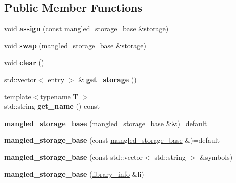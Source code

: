 \subsection*{Public Member Functions}
\begin{DoxyCompactItemize}
\item 
void {\bfseries assign} (const \hyperlink{a00213}{mangled\+\_\+storage\+\_\+base} \&storage)\hypertarget{a00213_ac4989f636dfa95e4227246011e78c3cf}{}\label{a00213_ac4989f636dfa95e4227246011e78c3cf}

\item 
void {\bfseries swap} (\hyperlink{a00213}{mangled\+\_\+storage\+\_\+base} \&storage)\hypertarget{a00213_a70f98c02298a3beee142579612d5c3af}{}\label{a00213_a70f98c02298a3beee142579612d5c3af}

\item 
void {\bfseries clear} ()\hypertarget{a00213_a3bfdf5084f6b0bfcaf41c4d05d2fc7af}{}\label{a00213_a3bfdf5084f6b0bfcaf41c4d05d2fc7af}

\item 
std\+::vector$<$ \hyperlink{a00097}{entry} $>$ \& {\bfseries get\+\_\+storage} ()\hypertarget{a00213_af90d143d8d8a55650fd50fba1d173cbf}{}\label{a00213_af90d143d8d8a55650fd50fba1d173cbf}

\item 
{\footnotesize template$<$typename T $>$ }\\std\+::string {\bfseries get\+\_\+name} () const \hypertarget{a00213_a5b89445a0a07d05b94566d49856d61f5}{}\label{a00213_a5b89445a0a07d05b94566d49856d61f5}

\item 
{\bfseries mangled\+\_\+storage\+\_\+base} (\hyperlink{a00213}{mangled\+\_\+storage\+\_\+base} \&\&)=default\hypertarget{a00213_ac8061dc543e120d34db0915d8f257f1b}{}\label{a00213_ac8061dc543e120d34db0915d8f257f1b}

\item 
{\bfseries mangled\+\_\+storage\+\_\+base} (const \hyperlink{a00213}{mangled\+\_\+storage\+\_\+base} \&)=default\hypertarget{a00213_aa935845957cce3593df595b4928dcead}{}\label{a00213_aa935845957cce3593df595b4928dcead}

\item 
{\bfseries mangled\+\_\+storage\+\_\+base} (const std\+::vector$<$ std\+::string $>$ \&symbols)\hypertarget{a00213_a4210a0787c4174b60adee2501fe0d99e}{}\label{a00213_a4210a0787c4174b60adee2501fe0d99e}

\item 
{\bfseries mangled\+\_\+storage\+\_\+base} (\hyperlink{a00192}{library\+\_\+info} \&li)\hypertarget{a00213_ad487412b81fc7bbc06ebec993301dcca}{}\label{a00213_ad487412b81fc7bbc06ebec993301dcca}


\end{DoxyCompactItemize}
